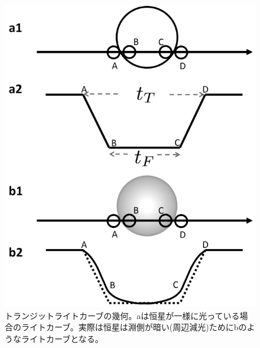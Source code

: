 \begin{figure}[htb]
\begin{center}
	\includegraphics[width=\linewidth]{fig/transitmodel.png}
	\caption{トランジットライトカーブの幾何。aは恒星が一様に光っている場合のライトカーブ。実際は恒星は淵側が暗い(周辺減光)ためにbのようなライトカーブとなる。}
	\label{fig:transitmodel}
\end{center}
\end{figure} 

